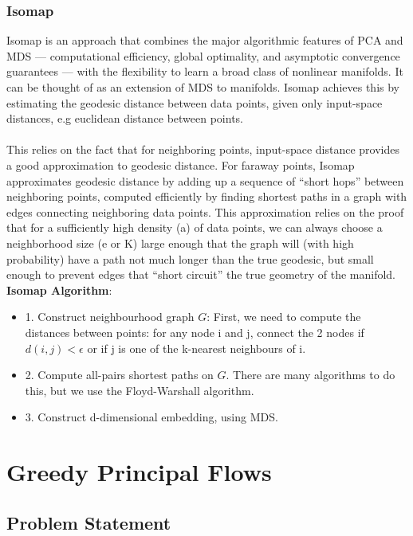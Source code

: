 \documentclass[12pt]{report}
\begin{document}
\newpage

\subsection*{Isomap}

Isomap is an approach that combines the major algorithmic features of PCA and MDS
 — computational efficiency, global optimality, 
 and asymptotic convergence guarantees — 
 with the flexibility to learn a broad class of nonlinear manifolds. 
 It can be thought of as an extension of MDS to manifolds. 
 Isomap achieves this by estimating the geodesic distance between data points, 
 given only input-space distances, e.g euclidean distance between points.\\
\\
This relies on the fact that for neighboring points, input-space distance provides a good approximation to geodesic distance. For faraway points, Isomap approximates geodesic distance by adding up a sequence of “short hops” between neighboring points, computed efficiently by finding shortest paths in a graph with edges connecting neighboring data points.  This approximation relies on the proof that for a sufficiently high density (a) of data points, we can always choose a neighborhood size (e or K) large enough that the graph will (with high probability) have a path not much longer than the true geodesic, but small enough to prevent edges that “short circuit” the true geometry of the manifold.\\
\textbf{Isomap Algorithm}:
\begin{itemize}
    \item 1. Construct neighbourhood graph $G$: First, we need to compute the distances between points: for any node i and j, connect the 2 nodes if $d(i,j) < \epsilon$ or if j is one of the k-nearest neighbours of i.
    \item 2. Compute all-pairs shortest paths on $G$. There are many algorithms to do this, but we use the Floyd-Warshall algorithm.
    \item 3. Construct d-dimensional embedding, using MDS.
\end{itemize}

\chapter*{Greedy Principal Flows}

\section{Problem Statement}
\end{document}
